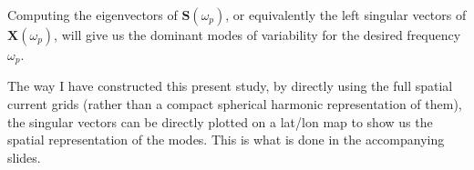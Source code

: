 \documentclass{article}
\begin{document}
\noindent
Computing the eigenvectors of $\mathbf{S}(\omega_p)$, or equivalently the left singular
vectors of $\mathbf{X}(\omega_p)$, will give us the dominant modes of variability
for the desired frequency $\omega_p$.

\noindent
The way I have constructed this present study, by directly using the full spatial current
grids (rather than a compact spherical harmonic representation of them), the singular
vectors can be directly plotted on a lat/lon map to show us the spatial representation
of the modes. This is what is done in the accompanying slides.
\end{document}
